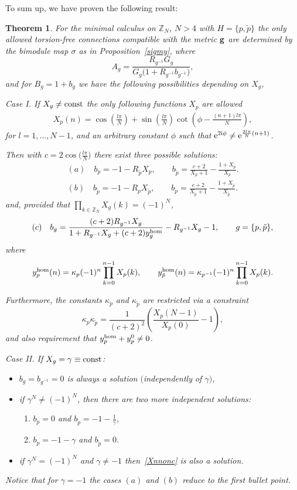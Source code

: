 \documentclass[pdftex]{sigma}
\numberwithin{equation}{section}
\newtheorem{Theorem}{Theorem}[section]
\newcommand{\ip}{{\tilde{p}}}
\begin{document}
To sum up, we have proven the following result:
\begin{Theorem}\label{theor_ZN}
For the minimal calculus on $\mathbb{Z}_N$, $N>4$ with $H=\{p,\ip\}$ the only allowed torsion-free connections compatible with the metric ${\bf g}$ are
determined by the bimodule map $\sigma$ as in Proposition~{\rm \ref{sigmy}}, where
\[
A_g=\frac{R_{g^{-1}}G_g}{G_g\big(1+R_{g^{-1}}b_{g^{-1}}\big)},
\]
and for $B_g=1+b_g$ we have the following possibilities depending on $X_g$,

{Case I.}
If $X_g\neq {\rm const}$ the only following functions $X_p$ are allowed
\begin{gather}
X_p(n)=\cos\left(\frac{l\pi }{N}\right)+\sin\left(\frac{l\pi}{N}\right)\cot\left(\phi-\frac{(n+1)l\pi}{N}\right),
\label{Xnnonc}
\end{gather}
for $l=1,\dots ,N-1$, and an arbitrary constant $\phi$ such that ${\rm e}^{2{\rm i}\phi}\neq {\rm e}^{\frac{2l\pi}{N}(n+1)}$.

Then with $c=2\cos\big(\frac{l\pi}{N}\big)$ there exist three possible solutions:
\begin{gather*}
(a) \quad b_p=-1-R_{\ip}X_p,\qquad
b_{\ip}=\frac{c+2}{X_p+1}-\frac{1+X_p}{X_p}.
\\ (b) \quad b_{\ip}=-1-R_{p}X_{\ip},\qquad
b_{p}=\frac{c+2}{X_{\ip}+1}-\frac{1+X_{\ip}}{X_{\ip}}.
\end{gather*}
and, provided that $\prod\limits_{k\in\mathbb{Z}_N}X_g(k)=(-1)^N$,
\begin{equation*}
(c) \quad b_g=\frac{(c+2)R_{g^{-1}}X_g}{1+R_{g^{-1}}X_g +(c+2)y_g^{{\rm hom}}}-R_{g^{-1}}X_g-1, \qquad g = \{p,\ip\},
\end{equation*}
where
\[
y_p^{{\rm hom}}(n) = \kappa_p (-1)^n \prod_{k=0}^{n-1} X_p(k),\qquad
y_{\ip}^{{\rm hom}}(n) = \kappa_{p^{-1}} (-1)^n \prod_{k=0}^{n-1} X_p(k).
\]

Furthermore, the constants $\kappa_p$ and $\kappa_{\ip}$ are restricted via a constraint
\[
\kappa_p\kappa_{\ip}=\frac{1}{(c+2)^2}\left(\frac{X_p(N-1)}{X_p(0)}-1\right),
\]
and also requirement that $y_p^{{\rm hom}}+y_p^0\neq 0$.

{Case II.}
If $X_g = \gamma \equiv{\rm const}$:
\begin{itemize}\itemsep=0pt
\item $b_g=b_{g^{-1}}=0$ is always a solution $($independently of $\gamma)$,
\item if $\gamma^N \neq (-1)^N$, then there are two more independent solutions:
\begin{enumerate}\itemsep=0pt
\item[$(a)$] $b_p=0$ and $b_{\ip}=-1-\frac{1}{\gamma}$,
\item[$(b)$] $b_p=-1-\gamma$ and $b_{\ip}=0$.
\end{enumerate}
\item if $\gamma^N=(-1)^N$ and $\gamma\neq -1$ then~\eqref{Xnnonc} is also a solution.
\end{itemize}
Notice that for $\gamma=-1$ the cases $(a)$ and $(b)$ reduce to the first bullet point.
\end{Theorem}
\end{document}
